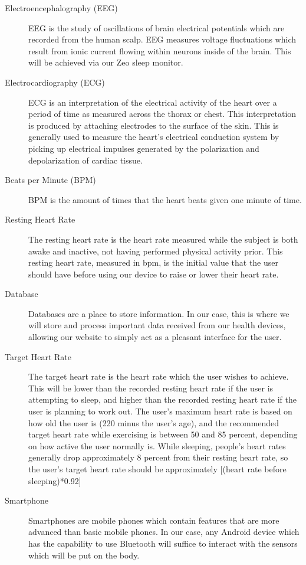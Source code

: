 \documentclass[letterpaper,english, 12pt]{scrreprt}
\begin{document}
\begin{description}
	\item[Electroencephalography (EEG)] EEG is the study of oscillations of brain electrical potentials which are recorded from the human scalp. EEG measures voltage fluctuations which result from ionic current flowing within neurons inside of the brain. This will be achieved via our Zeo sleep monitor.
	\item[Electrocardiography (ECG)] ECG is an interpretation of the electrical activity of the heart over a period of time as measured across the thorax or chest. This interpretation is produced by attaching electrodes to the surface of the skin. This is generally used to measure the heart's electrical conduction system by picking up electrical impulses generated by the polarization and depolarization of cardiac tissue.

	\item[Beats per Minute (BPM)] BPM is the amount of times that the heart beats given one minute of time.

	\item[Resting Heart Rate] The resting heart rate is the heart rate measured while the subject is both awake and inactive, not having performed physical activity prior. This resting heart rate, measured in bpm, is the initial value that the user should have before using our device to raise or lower their heart rate.

	\item[Database] Databases are a place to store information. In our case, this is where we will store and process important data received from our health devices, allowing our website to simply act as a pleasant interface for the user.

	\item[Target Heart Rate] The target heart rate is the heart rate which the user wishes to achieve. This will be lower than the recorded resting heart rate if the user is attempting to sleep, and higher than the recorded resting heart rate if the user is planning to work out. The user's maximum heart rate is based on how old the user is (220 minus the user's age), and the recommended target heart rate while exercising is between 50 and 85 percent, depending on how active the user normally is. While sleeping, people's heart rates generally drop approximately 8 percent from their resting heart rate, so the user's target heart rate should be approximately [(heart rate before sleeping)*0.92]

	\item[Smartphone] Smartphones are mobile phones which contain features that are more advanced than basic mobile phones. In our case, any Android device which has the capability to use Bluetooth will suffice to interact with the sensors which will be put on the body.


\end{description}
\end{document}
